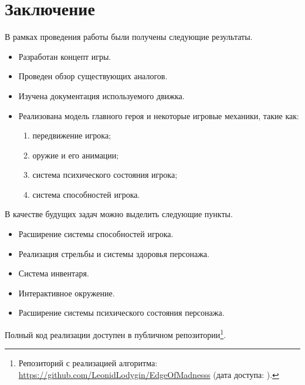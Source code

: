 
\section*{Заключение}
В рамках проведения работы были получены следующие результаты.

\begin{itemize}
\item Разработан концепт игры.
\item Проведен обзор существующих аналогов.
\item Изучена документация используемого движка.
\item Реализована модель главного героя и некоторые игровые механики, такие как:
    \begin{enumerate}
       \item  передвижение игрока;
       \item  оружие и его анимации;
       \item  система психического состояния игрока;
       \item  система способностей игрока.
    \end{enumerate}   
\end{itemize}

\noindent В качестве будущих задач можно выделить следующие пункты.
\begin{itemize}
\item Расширение системы способностей игрока.
\item Реализация стрельбы и системы здоровья персонажа.
\item Система инвентаря.
\item Интерактивное окружение.
\item Расширение системы психического состояния персонажа.
\end{itemize}

Полный код реализации доступен в публичном репозитории\footnote{Репозиторий с реализацией алгоритма: \url{https://github.com/LeonidLodygin/EdgeOfMadnesss} (дата доступа:   ).}.
